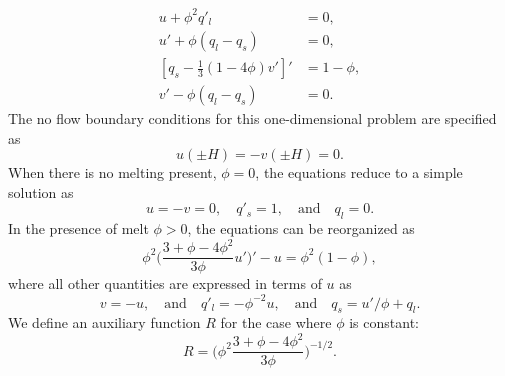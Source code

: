 \begin{equation}\label{eq:qdcolumncompaction}
		  \begin{aligned}
					 u + \phi^{2} q'_l &= 0, \\
					 u' + \phi(q_l - q_s)&= 0, \\
					 [q_s - \frac{1}{3}(1-4\phi)v']' &= 1-\phi,\\
					 v' - \phi(q_l - q_s) &=0.
		  \end{aligned}
\end{equation}
The no flow boundary conditions for this one-dimensional problem
are specified as
\begin{equation}
		  u(\pm H) =-v(\pm H) = 0.
\end{equation}
When there is no melting present, $\phi = 0$, the equations reduce to 
a simple solution as
\begin{equation}
		  u = -v = 0,\quad q'_s = 1, \quad\text{and}\quad q_l = 0.
\end{equation}
In the presence of melt $\phi > 0$, the equations can be reorganized as
\begin{equation}\label{eq:ode}
		  \phi^{2}\bigg(\frac{3+\phi - 4\phi^2}{3\phi}u' \bigg)' - u = \phi^{2}(1-\phi),
\end{equation}
where all other quantities are expressed in terms of $u$ as 
\begin{equation}
		  v=-u, \quad \text{and}\quad  q'_l = -\phi^{-2}u, \quad \text{and}\quad q_s = u'/\phi + q_l.
\end{equation}
We define an auxiliary function $R$ for the case where $\phi$ is constant:
\begin{equation}\label{eq:Rphi}
		  R = \bigg( \phi^{2}\frac{3+\phi - 4\phi^2}{3\phi} \bigg)^{-1/2}.
\end{equation}


